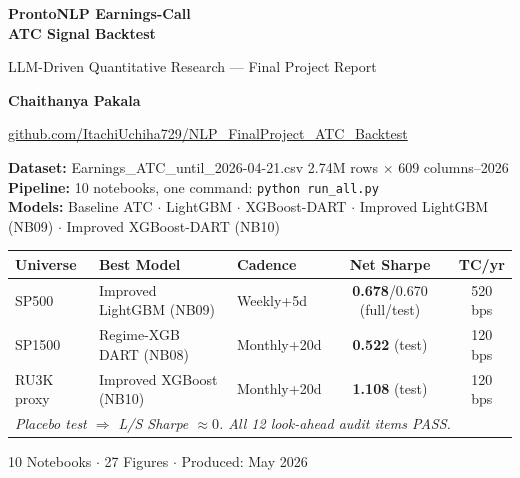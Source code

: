 \documentclass[11pt,a4paper]{article}
\begin{document}
\begin{titlepage}
\centering
\vspace*{1cm}
{\Huge\bfseries\color{accent}ProntoNLP Earnings-Call\\[0.4em]
ATC Signal Backtest\par}
\vspace{0.6cm}
{\large\color{darkgray}LLM-Driven Quantitative Research --- Final Project Report\par}
\vspace{1.5cm}
{\Large\bfseries Chaithanya Pakala\par}
\vspace{0.3cm}
{\small\href{https://github.com/ItachiUchiha729/NLP_FinalProject_ATC_Backtest}%
{github.com/ItachiUchiha729/NLP\_FinalProject\_ATC\_Backtest}\par}
\vspace{1cm}

\begin{callout}
\centering{}
\textbf{Dataset:} Earnings\_ATC\_until\_2026-04-21.csv\quad
2.74M rows $\times$ 609 columns--2026\\
\textbf{Pipeline:} 10 notebooks, one command: \texttt{python run\_all.py}\\
\textbf{Models:} Baseline ATC $\cdot$ LightGBM $\cdot$ XGBoost-DART $\cdot$ Improved LightGBM (NB09) $\cdot$ Improved XGBoost-DART (NB10)
\end{callout}

\vspace{0.8cm}
\begin{tabular}{lllcc}
\toprule
\textbf{Universe} & \textbf{Best Model} & \textbf{Cadence} & \textbf{Net Sharpe} & \textbf{TC/yr}\\
\midrule
SP500      & Improved LightGBM (NB09) & Weekly+5d   & \textbf{0.678}/0.670 (full/test) & 520 bps\\
SP1500     & Regime-XGB DART (NB08)   & Monthly+20d & \textbf{0.522} (test)            & 120 bps\\
RU3K proxy & Improved XGBoost (NB10)  & Monthly+20d & \textbf{1.108} (test)            & 120 bps\\
\bottomrule
\multicolumn{5}{l}{\small\textit{Placebo test $\Rightarrow$ L/S Sharpe $\approx 0$. All 12 look-ahead audit items PASS.}}
\end{tabular}
\vfill
{\small 10 Notebooks $\cdot$ 27 Figures $\cdot$ Produced: May 2026}
\end{titlepage}
\end{document}
